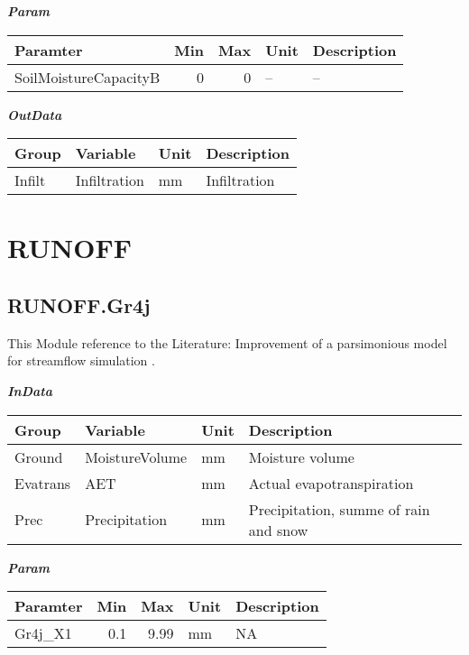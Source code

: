 \documentclass[
]{book}
\begin{document}
\textbf{\emph{Param}}

\begin{table}[!h]
\centering
\begin{tabular}{l|r|r|l|l}
\hline
Paramter & Min & Max & Unit & Description\\
\hline
SoilMoistureCapacityB & 0 & 0 & -- & --\\
\hline
\end{tabular}
\end{table}

\textbf{\emph{OutData}}

\begin{table}[!h]
\centering
\begin{tabular}{l|l|l|l}
\hline
Group & Variable & Unit & Description\\
\hline
Infilt & Infiltration & mm & Infiltration\\
\hline
\end{tabular}
\end{table}

\hypertarget{runoff}{%
\section{RUNOFF}\label{runoff}}

\hypertarget{runoff.gr4j}{%
\subsection{RUNOFF.Gr4j}\label{runoff.gr4j}}

This Module reference to the Literature: Improvement of a parsimonious model for streamflow simulation \citep{Perrin.2003}.

\textbf{\emph{InData}}

\begin{table}[!h]
\centering
\begin{tabular}{l|l|l|l}
\hline
Group & Variable & Unit & Description\\
\hline
Ground & MoistureVolume & mm & Moisture volume\\
\cline{1-4}
Evatrans & AET & mm & Actual evapotranspiration\\
\cline{1-4}
Prec & Precipitation & mm & Precipitation, summe of rain and snow\\
\hline
\end{tabular}
\end{table}

\textbf{\emph{Param}}

\begin{table}[!h]
\centering
\begin{tabular}{l|r|r|l|l}
\hline
Paramter & Min & Max & Unit & Description\\
\hline
Gr4j\_X1 & 0.1 & 9.99 & mm & NA\\
\hline
\end{tabular}
\end{table}
\end{document}
